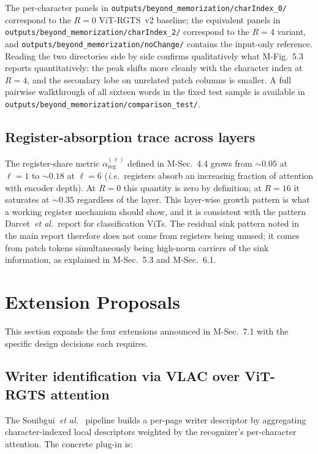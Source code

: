 \documentclass[11pt,a4paper]{article}
\newcommand{\ie}{\textit{i.e.}}
\newcommand{\etal}{\textit{et al.}}
\begin{document}
The per-character panels in \texttt{outputs/beyond\_memorization/charIndex\_0/} correspond to the $R = 0$ ViT-RGTS~v2 baseline; the equivalent panels in \texttt{outputs/beyond\_memorization/charIndex\_2/} correspond to the $R = 4$ variant, and \texttt{outputs/beyond\_memorization/noChange/} contains the input-only reference. Reading the two directories side by side confirms qualitatively what M-Fig.~5.3 reports quantitatively: the peak shifts more cleanly with the character index at $R = 4$, and the secondary lobe on unrelated patch columns is smaller. A full pairwise walkthrough of all sixteen words in the fixed test sample is available in \texttt{outputs/beyond\_memorization/comparison\_test/}.

\subsection{Register-absorption trace across layers}

The register-share metric $\alpha_{\mathrm{reg}}^{(\ell)}$ defined in M-Sec.~4.4 grows from ${\sim}0.05$ at $\ell = 1$ to ${\sim}0.18$ at $\ell = 6$ (\ie\ registers absorb an increasing fraction of attention with encoder depth). At $R = 0$ this quantity is zero by definition; at $R = 16$ it saturates at ${\sim}0.35$ regardless of the layer. This layer-wise growth pattern is what a working register mechanism should show, and it is consistent with the pattern Darcet~\etal\ report for classification ViTs. The residual sink pattern noted in the main report therefore does not come from registers being unused; it comes from patch tokens simultaneously being high-norm carriers of the sink information, as explained in M-Sec.~5.3 and M-Sec.~6.1.

\section{Extension Proposals}
\label{supp:extensions}

This section expands the four extensions announced in M-Sec.~7.1 with the specific design decisions each requires.

\subsection{Writer identification via VLAC over ViT-RGTS attention}

The Souibgui~\etal~\cite{souibgui2022vlac} pipeline builds a per-page writer descriptor by aggregating character-indexed local descriptors weighted by the recognizer's per-character attention. The concrete plug-in is:
\end{document}
